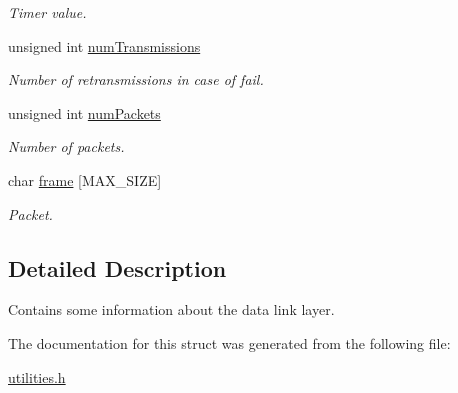 \begin{DoxyCompactItemize}
\begin{DoxyCompactList}\small\item\em Timer value. \end{DoxyCompactList}\item 
\hypertarget{struct_link_layer_ab9a2bab82170cd79577445a56b92b74c}{unsigned int \hyperlink{struct_link_layer_ab9a2bab82170cd79577445a56b92b74c}{num\-Transmissions}}\label{struct_link_layer_ab9a2bab82170cd79577445a56b92b74c}

\begin{DoxyCompactList}\small\item\em Number of retransmissions in case of fail. \end{DoxyCompactList}\item 
\hypertarget{struct_link_layer_a1a7d90e68b90219ededf66d3535d5eb5}{unsigned int \hyperlink{struct_link_layer_a1a7d90e68b90219ededf66d3535d5eb5}{num\-Packets}}\label{struct_link_layer_a1a7d90e68b90219ededf66d3535d5eb5}

\begin{DoxyCompactList}\small\item\em Number of packets. \end{DoxyCompactList}\item 
\hypertarget{struct_link_layer_a9cdc884a9d83cc643bd8d9ff6d50c6e9}{char \hyperlink{struct_link_layer_a9cdc884a9d83cc643bd8d9ff6d50c6e9}{frame} \mbox{[}M\-A\-X\-\_\-\-S\-I\-Z\-E\mbox{]}}\label{struct_link_layer_a9cdc884a9d83cc643bd8d9ff6d50c6e9}

\begin{DoxyCompactList}\small\item\em Packet. \end{DoxyCompactList}\end{DoxyCompactItemize}


\subsection{Detailed Description}
Contains some information about the data link layer. 

The documentation for this struct was generated from the following file\-:\begin{DoxyCompactItemize}
\item 
\hyperlink{utilities_8h}{utilities.\-h}\end{DoxyCompactItemize}
